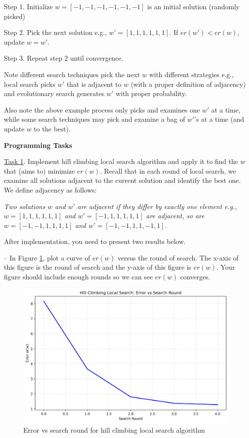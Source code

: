 \documentclass[a4paper, 11pt]{article}
\begin{document}
Step 1. Initialize $w = [-1,-1,-1,-1,-1,-1]$ 
is an initial solution (randomly picked) 

Step 2. Pick the next solution e.g., $w' = [1, 1, 1, 1, 1, 1]$. If $er(w') < er(w)$, update $w = w'$.

Step 3. Repeat step 2 until convergence. 

Note different search techniques pick the next $w$ with different strategies e.g., local search picks $w'$ that is adjacent to $w$ (with a proper definition of adjacency) 
and evolutionary search generates $w'$ with proper probability. 

Also note the above example process only picks and 
examines one $w'$ at a time, while some search techniques 
may pick and examine a bag of $w'$'s at a time (and 
update $w$ to the best). 

\newpage 

\textbf{\large Programming Tasks}


\underline{Task 1}. Implement hill climbing local search 
algorithm and apply it to find the $w$ that 
(aims to) minimize $er(w)$. 
Recall that in each round of local search, we examine 
all solutions adjacent to the current solution and 
identify the best one. We define adjacency as follows: 

\textit{Two solutions $w$ and $w'$ are adjacent if they 
differ by exactly one element e.g., $w = [1,1,1,1,1,1]$ 
and $w' = [-1,1,1,1,1,1]$ are adjacent, so are 
$w = [-1,-1,1,1,1,1]$ and $w' = [-1,-1,1,1,-1,1]$.} 


After implementation, you need to present two results below. 

-- In Figure \ref{fig:hw2t1}, plot a curve of 
$er(w)$ versus the round of search. 
The x-axis of this figure is the round of search and the y-axis of this figure is $er(w)$. Your figure should include 
enough rounds so we can see $er(w)$ converges. 

\begin{figure}[h!]
    \centering
    \includegraphics[width=0.8\linewidth]{../../local_search_error.png}
    \caption{Error vs search round for hill climbing local search algorithm}
    \label{fig:hw2t1}
\end{figure}
\end{document}
